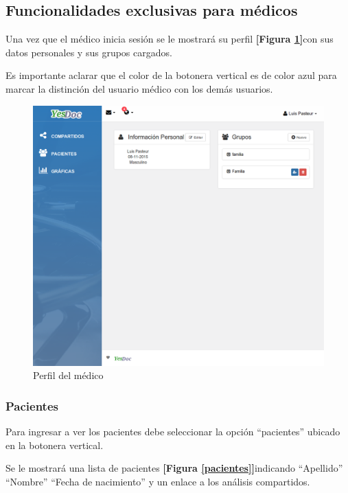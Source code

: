 \subsection{Funcionalidades exclusivas para médicos}
\label{manual_para_medico}
\begin{sloppypar}
	Una vez que el médico inicia sesión se le mostrará su perfil \textbf{[Figura \ref{perfil_medico}]}con sus datos personales y sus grupos cargados. 
	
	Es importante aclarar que el color de la botonera vertical es de color azul para marcar la distinción del usuario médico con los demás usuarios. 
	
	\begin{figure}
		\centering
		\includegraphics[width=.8\textwidth]{img/manual_de_usuario/perfil_medico}
		\caption{Perfil del médico}
		\label{perfil_medico}
	\end{figure}
\end{sloppypar}



\subsubsection{Pacientes}

Para ingresar a ver los pacientes debe seleccionar la opción ``pacientes'' ubicado en la botonera vertical.

Se le mostrará una lista de pacientes \textbf{[Figura \ref{pacientes}]}indicando ``Apellido'' ``Nombre'' ``Fecha de nacimiento'' y un enlace a los análisis compartidos.

